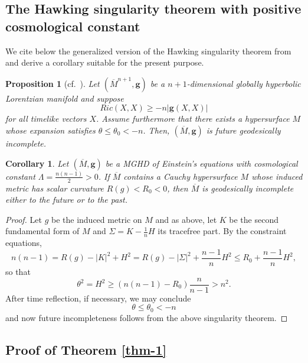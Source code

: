\documentclass[a4paper,10pt]{article}
\theoremstyle{plain}
\newtheorem{prop}[thm]{Proposition}
\newtheorem{cor}[thm]{Corollary}
\theoremstyle{definition}
\theoremstyle{remark}
\newtheorem{rem}[thm]{Remark}
\theoremstyle{plain}
\newcommand{\eq}[1]{\begin{equation}#1\end{equation}}
\numberwithin{equation}{section}
\begin{document}
\subsection{The Hawking singularity theorem with positive cosmological constant}
We cite below the generalized version of the Hawking singularity theorem from \cite{AnGa04} and derive a corollary suitable for the present purpose.
\begin{prop}[cf.~{\cite[Proposition 3.4]{AnGa04}}]\label{sing-thm}
	Let $(\overline M^{n+1},\mathbf{g})$ be a $n+1$-dimensional globally hyperbolic Lorentzian manifold and suppose 
	\eq{Ric(X,X)\geq -n |\mathbf g(X,X)|}
	for all timelike vectors $X$. Assume furthermore that there exists a hypersurface $M$ whose expansion satisfies $\theta\leq \theta_0<-n$. Then, $(\overline M,\mathbf g)$ is future geodesically incomplete.
\end{prop}

\begin{cor}
	Let $(\overline{M},\mathbf{g})$ be a MGHD of Einstein's equations with cosmological constant $\Lambda=\frac{n(n-1)}{2}>0$. If $\overline{M}$ contains a Cauchy hypersurface $M$ whose induced metric has scalar curvature $R(g)<R_0<0$, then $\overline{M}$ is geodesically incomplete either to the future or to the past. 
	\end{cor}
\begin{proof}
	Let $g$ be the induced metric on $M$ and as above, let $K$ be the second fundamental form of $M$ and $\Sigma=K-\frac{1}{n}H$ its tracefree part. By the constraint equations, 
	\eq{n(n-1)=R(g)-|K|^2+H^2=R(g)-|\Sigma|^2+\frac{n-1}{n}H^2\leq R_0+ \frac{n-1}{n}H^2,}
	so that 
	\eq{\theta^2=H^2\geq (n(n-1)-R_0)\frac{n}{n-1}>n^2.}
	After time reflection, if necessary, we may conclude 
	\eq{\theta\leq \theta_0<-n}
	and now future incompleteness follows from the above singularity theorem.
\end{proof}

\subsection{Proof of Theorem \ref{thm-1}}
\label{sec : 4}
\end{document}
